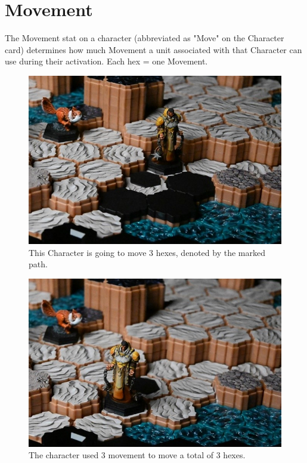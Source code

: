 \documentclass[../main.tex]{subfiles}
\begin{document}
\section{Movement}
The Movement stat on a character (abbreviated as "Move" on the Character card) determines how much Movement a unit associated with that Character can use during their activation. Each hex = one Movement.

\begin{figure}[h]
    \centering
    \includegraphics[width=1\linewidth]{chapters//Movement/TimeStrikeMovement1.jpg}
    \caption{This Character is going to move 3 hexes, denoted by the marked path.}
\end{figure}

\begin{figure}[h]
    \centering
    \includegraphics[width=1\linewidth]{chapters//Movement/TimeStrikeMovement2.jpg}
    \caption{The character used 3 movement to move a total of 3 hexes.}
\end{figure}
\end{document}
